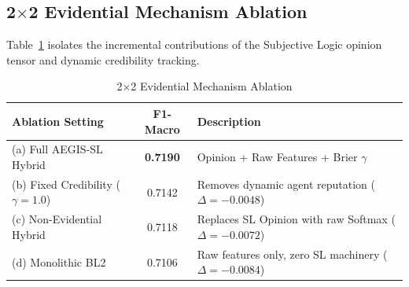 \begin{table}[htbp]
\caption{Structural Property Coverage Matrix}
\label{tab:properties}
\centering
{}
\end{table}

\subsection{2$\times$2 Evidential Mechanism Ablation}
Table~\ref{tab:2x2_ablation} isolates the incremental contributions of the Subjective Logic opinion tensor and dynamic credibility tracking.

\begin{table}[htbp]
\caption{2$\times$2 Evidential Mechanism Ablation}
\label{tab:2x2_ablation}
\centering
\begin{tabular}{lcl}
\toprule
\textbf{Ablation Setting} & \textbf{F1-Macro} & \textbf{Description} \\
\midrule
(a) Full AEGIS-SL Hybrid & \textbf{0.7190} & Opinion + Raw Features + Brier $\gamma$ \\
(b) Fixed Credibility ($\gamma=1.0$) & 0.7142 & Removes dynamic agent reputation ($\Delta = -0.0048$) \\
(c) Non-Evidential Hybrid & 0.7118 & Replaces SL Opinion with raw Softmax ($\Delta = -0.0072$) \\
(d) Monolithic BL2 & 0.7106 & Raw features only, zero SL machinery ($\Delta = -0.0084$) \\
\bottomrule
\end{tabular}
\end{table}

